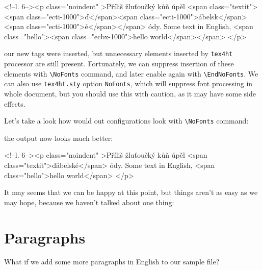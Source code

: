 \begin{htmlsource}
<!--l. 6--><p class="noindent" >Příliš žluťoučký kůň úpěl <span class="textit"><span 
class="ecti-1000">ď</span><span 
class="ecti-1000">ábelsk</span><span 
class="ecti-1000">é</span></span> ódy. Some text in English, <span class="hello"><span 
class="ecbx-1000">hello world</span></span>
</p> 
\end{htmlsource}

our new tags were inserted, but unnecessary elements inserted by
\texttt{tex4ht} processor are still present. Fortunately, we can
suppress insertion of these elements with
\texttt{\textbackslash{}NoFonts} command, and later enable again with
\texttt{\textbackslash{}EndNoFonts}. We can also use \texttt{tex4ht.sty}
option \texttt{NoFonts}, which will suppress font processing in whole
document, but you should use this with caution, as it may have some side
effects.

Let's take a look how would out configurations look with
\texttt{\textbackslash{}NoFonts} command:

\begin{texsource}
{\EndNoFonts{}}
{\EndNoFonts{}}

\EndPreamble
\end{texsource}

the output now looks much better:

\begin{htmlsource}
<!--l. 6--><p class="noindent" >Příliš žluťoučký kůň úpěl <span class="textit">ďábelské</span> ódy. Some text in English, <span class="hello">hello world</span>
</p> 
\end{htmlsource}

It may seems that we can be happy at this point, but things aren't as
easy as we may hope, because we haven't talked about one thing:

\hypertarget{paragraphs}{%
\section{Paragraphs}\label{paragraphs}}

What if we add some more paragraphs in English to our sample file?

